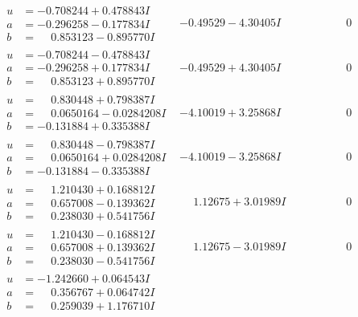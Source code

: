 \documentclass[1p]{elsarticle_modified}
\theoremstyle{definition}
\begin{document}
$$\begin{array}{c|c|c}
\begin{aligned}
u &= -0.708244 + 0.478843 I \\
a &= -0.296258 - 0.177834 I \\
b &= \phantom{-}0.853123 - 0.895770 I\end{aligned}
 & -0.49529 - 4.30405 I & \phantom{-0.000000 } 0 \\ \hline\begin{aligned}
u &= -0.708244 - 0.478843 I \\
a &= -0.296258 + 0.177834 I \\
b &= \phantom{-}0.853123 + 0.895770 I\end{aligned}
 & -0.49529 + 4.30405 I & \phantom{-0.000000 } 0 \\ \hline\begin{aligned}
u &= \phantom{-}0.830448 + 0.798387 I \\
a &= \phantom{-}0.0650164 - 0.0284208 I \\
b &= -0.131884 + 0.335388 I\end{aligned}
 & -4.10019 + 3.25868 I & \phantom{-0.000000 } 0 \\ \hline\begin{aligned}
u &= \phantom{-}0.830448 - 0.798387 I \\
a &= \phantom{-}0.0650164 + 0.0284208 I \\
b &= -0.131884 - 0.335388 I\end{aligned}
 & -4.10019 - 3.25868 I & \phantom{-0.000000 } 0 \\ \hline\begin{aligned}
u &= \phantom{-}1.210430 + 0.168812 I \\
a &= \phantom{-}0.657008 - 0.139362 I \\
b &= \phantom{-}0.238030 + 0.541756 I\end{aligned}
 & \phantom{-}1.12675 + 3.01989 I & \phantom{-0.000000 } 0 \\ \hline\begin{aligned}
u &= \phantom{-}1.210430 - 0.168812 I \\
a &= \phantom{-}0.657008 + 0.139362 I \\
b &= \phantom{-}0.238030 - 0.541756 I\end{aligned}
 & \phantom{-}1.12675 - 3.01989 I & \phantom{-0.000000 } 0 \\ \hline\begin{aligned}
u &= -1.242660 + 0.064543 I \\
a &= \phantom{-}0.356767 + 0.064742 I \\
b &= \phantom{-}0.259039 + 1.176710 I\end{aligned}

\end{array}$$
\end{document}
